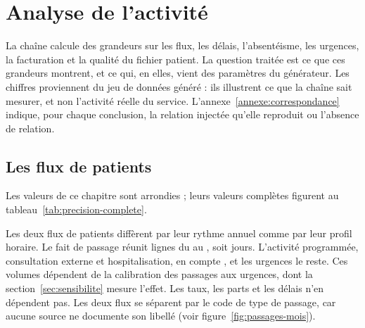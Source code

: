 
\chapter{Analyse de l'activité}\label{chap:activite}

La chaîne calcule des grandeurs sur les flux, les délais, l'absentéisme, les urgences, la
facturation et la qualité du fichier patient. La question traitée est ce que ces grandeurs montrent,
et ce qui, en elles, vient des paramètres du générateur. Les chiffres proviennent du jeu de données
généré : ils illustrent ce que la chaîne sait mesurer, et non l'activité réelle du service.
L'annexe~\ref{annexe:correspondance} indique, pour chaque conclusion, la relation injectée qu'elle
reproduit ou l'absence de relation.

\section{Les flux de patients}

Les valeurs de ce chapitre sont arrondies ; leurs valeurs complètes figurent au
tableau~\ref{tab:precision-complete}.

Les deux flux de patients diffèrent par leur rythme annuel comme par leur profil horaire. Le fait de
passage réunit  lignes du  au
, soit  jours. L'activité programmée, consultation
externe et hospitalisation, en compte , et les urgences le reste. Ces
volumes dépendent de la calibration des passages aux urgences, dont la
section~\ref{sec:sensibilite} mesure l'effet. Les taux, les parts et les délais n'en dépendent pas.
Les deux flux se séparent par le code de type de passage, car aucune source ne documente son
libellé (voir figure~\ref{fig:passages-mois}).

